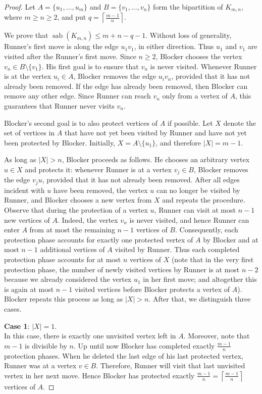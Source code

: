 \documentclass[10pt,a4paper]{amsart}
\DeclareMathOperator{\sab}{\mathrm{sab}}
\begin{document}
\begin{proof}
Let $A=\{u_1,\ldots,u_m\}$ and $B=\{v_1,\ldots,v_n\}$ form the bipartition of $K_{m,n}$, where $m \ge n \ge 2$, and put $q=\left\lceil\frac{m-1}{n}\right\rceil$. 

We prove that $\sab(K_{m,n})\le m+n-q-1$. Without loss of generality, Runner's first move is along the edge $u_1v_1$, in either direction. Thus $u_1$ and $v_1$ are visited after the Runner's first move. Since $n \ge 2$, Blocker chooses the vertex $v_n\in B\setminus\{v_1\}$. His first goal is to ensure that $v_n$ is never visited. Whenever Runner is at the vertex $u_i \in A$, Blocker removes the edge $u_iv_n$, provided that it has not already been removed. If the edge has already been removed, then Blocker can remove any other edge. Since Runner can reach $v_n$ only from a vertex of $A$, this guarantees that Runner never visits $v_n$.

Blocker's second goal is to also protect vertices of $A$ if possible. Let $X$ denote the set of vertices in $A$ that have not yet been visited by Runner and have not yet been protected by Blocker. Initially, $X=A\setminus\{u_1\}$, and therefore $|X|=m-1$.

As long as $|X|>n$, Blocker proceeds as follows. He chooses an arbitrary vertex $u\in X$ and protects it: whenever Runner is at a vertex $v_j\in B$, Blocker removes the edge $v_ju$, provided that it has not already been removed. After all edges incident with $u$ have been removed, the vertex $u$ can no longer be visited by Runner, and Blocker chooses a new vertex from $X$ and repeats the procedure. Observe that during the protection of a vertex $u$, Runner can visit at most $n-1$ new vertices of $A$. Indeed, the vertex $v_n$ is never visited, and hence Runner can enter $A$ from at most the remaining $n-1$ vertices of $B$. Consequently, each protection phase accounts for exactly one protected vertex of $A$ by Blocker and at most $n-1$ additional vertices of $A$ visited by Runner. Thus each completed protection phase accounts for at most $n$ vertices of $X$ (note that in the very first protection phase, the number of newly visited vertices by Runner is at most $n-2$ because we already considered the vertex $u_1$ in her first move; and altogether this is again at most $n-1$ visited vertices before Blocker protects a vertex of $A$). Blocker repeats this process as long as $|X|>n$. After that, we distinguish three cases.

\medskip\noindent
{\bf Case 1}: $|X|=1$. \\
In this case, there is exactly one unvisited vertex left in $A$. Moreover, note that $m-1$ is divisible by $n$. Up until now Blocker has completed exactly $\frac{m-1}{n}$ protection phases. When he deleted the last edge of his last protected vertex, Runner was at a vertex $v \in B$. Therefore, Runner will visit that last unvisited vertex in her next move. Hence Blocker has protected exactly $\frac{m-1}{n}=\left\lceil\frac{m-1}{n}\right\rceil$ vertices of $A$.


\end{proof}
\end{document}
